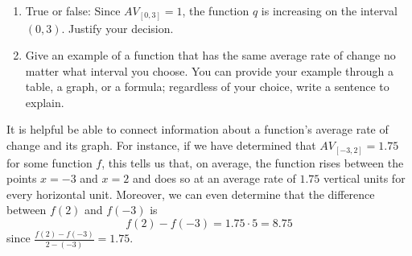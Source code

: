 \documentclass[nooutcomes]{ximera}
\begin{document}
\begin{exploration}
\begin{enumerate}[label=\alph*.]
\item True or false: Since $AV_{[0,3]} = 1$, the function $q$ is increasing on the interval $(0,3)$.  Justify your decision.
\item Give an example of a function that has the same average rate of change no matter what interval you choose. You can provide your example through a table, a graph, or a formula; regardless of your choice, write a sentence to explain.
\end{enumerate}

\end{exploration}

It is helpful be able to connect information about a function's average rate of change and its graph.  For instance, if we have determined that $AV_{[-3,2]} = 1.75$ for some function $f$, this tells us that, on average, the function rises between the points $x = -3$ and $x = 2$ and does so at an average rate of $1.75$ vertical units for every horizontal unit.  Moreover, we can even determine that the difference between $f(2)$ and $f(-3)$ is%
\begin{equation*}
f(2)-f(-3) = 1.75 \cdot 5 = 8.75
\end{equation*}
since $\frac{f(2)-f(-3)}{2-(-3)} = 1.75$.
\end{document}
